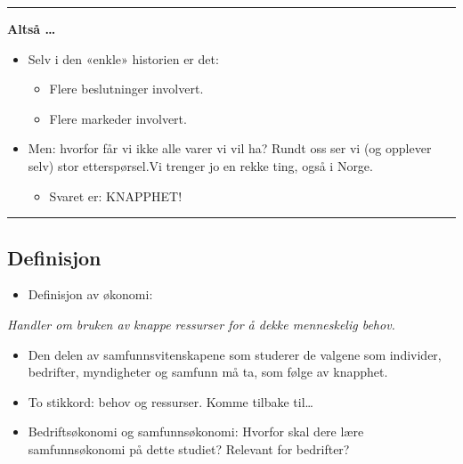 \documentclass[
  letterpaper,
  DIV=11,
  numbers=noendperiod]{scrartcl}
\providecommand{\tightlist}{%
  \setlength{\itemsep}{0pt}\setlength{\parskip}{0pt}}\usepackage{longtable,booktabs,array}
\begin{document}
\begin{center}\rule{0.5\linewidth}{0.5pt}\end{center}

\textbf{Altså \ldots{}}

\begin{itemize}
\tightlist
\item
  Selv i den «enkle» historien er det:

  \begin{itemize}
  \tightlist
  \item
    Flere beslutninger involvert.
  \item
    Flere markeder involvert.
  \end{itemize}
\item
  Men: hvorfor får vi ikke alle varer vi vil ha? Rundt oss ser vi (og
  opplever selv) stor etterspørsel.Vi trenger jo en rekke ting, også i
  Norge.

  \begin{itemize}
  \tightlist
  \item
    Svaret er: KNAPPHET!
  \end{itemize}
\end{itemize}

\begin{center}\rule{0.5\linewidth}{0.5pt}\end{center}

\subsection{Definisjon}\label{definisjon}

\begin{itemize}
\tightlist
\item
  Definisjon av økonomi:
\end{itemize}

\emph{Handler om bruken av knappe ressurser for å dekke menneskelig
behov.}

\begin{itemize}
\tightlist
\item
  Den delen av samfunnsvitenskapene som studerer de valgene som
  individer, bedrifter, myndigheter og samfunn må ta, som følge av
  knapphet.
\item
  To stikkord: behov og ressurser. Komme tilbake til\ldots{}
\item
  Bedriftsøkonomi og samfunnsøkonomi: Hvorfor skal dere lære
  samfunnsøkonomi på dette studiet? Relevant for bedrifter?
\end{itemize}
\end{document}
